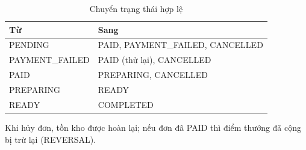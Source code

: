 \begin{table}[htbp]\centering
\caption{Chuyển trạng thái hợp lệ}\label{tab:state}
\begin{tabular}{@{}p{3.2cm}p{9.6cm}@{}}\toprule
\textbf{Từ} & \textbf{Sang} \\ \midrule
PENDING & PAID, PAYMENT\_FAILED, CANCELLED \\
PAYMENT\_FAILED & PAID (thử lại), CANCELLED \\
PAID & PREPARING, CANCELLED \\
PREPARING & READY \\
READY & COMPLETED \\ \bottomrule
\end{tabular}
\end{table}
Khi hủy đơn, tồn kho được hoàn lại; nếu đơn đã PAID thì điểm thưởng đã cộng bị trừ lại (REVERSAL).
